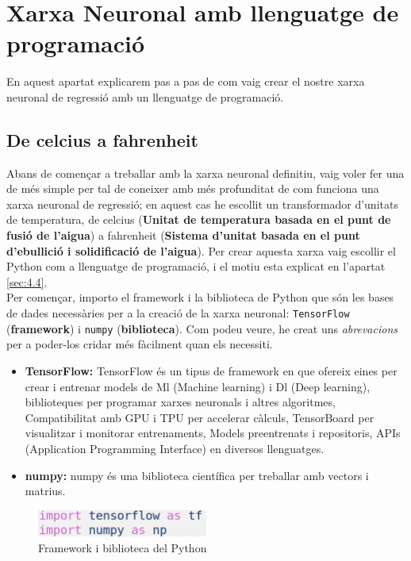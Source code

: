 \section{Xarxa Neuronal amb llenguatge de programació}\label{sec:10}
En aquest apartat explicarem pas a pas de com vaig crear el nostre xarxa neuronal de regressió amb un llenguatge de programació.

\subsection{De celcius a fahrenheit}

Abans de començar a treballar amb la xarxa neuronal definitiu, vaig voler fer una de més simple per tal de coneixer amb més profunditat de com funciona una xarxa neuronal de regressió; en aquest cas he escollit un transformador d'unitats de temperatura, de celcius (\textbf{Unitat de temperatura basada en el punt de fusió de l'aigua}) a fahrenheit (\textbf{Sistema d'unitat basada en el punt d'ebullició i solidificació de l'aigua}). Per crear aquesta xarxa vaig escollir el Python com a llenguatge de programació, i el motiu esta explicat en l'apartat \ref{sec:4.4}.\\


Per començar, importo el framework i la biblioteca de Python que són les bases de dades necessàries per a la creació de la xarxa neuronal: \texttt{TensorFlow} (\textbf{framework}) i \texttt{{numpy}} (\textbf{biblioteca}). Com podeu veure, he creat uns \textit{abrevacions} per a poder-los cridar més fàcilment quan els necessiti.

\begin{itemize}
 \item \textbf{TensorFlow: }\label{TensorFlow} TensorFlow és un tipus de framework en que ofereix eines per crear i entrenar models de Ml (Machine learning) i Dl (Deep learning), biblioteques per programar xarxes neuronals i altres algoritmes, Compatibilitat amb GPU i TPU per accelerar càlculs, TensorBoard per visualitzar i monitorar entrenaments, Models preentrenats i repositoris, APIs (Application Programming Interface) en diversos llenguatges.
 \item \textbf{numpy: }\label{numpy} numpy és una biblioteca científica per treballar amb vectors i matrius.
\end{itemize}
\begin{figure}[H]
    \centering
    \includegraphics[width=0.5\textwidth]{./figures/1.png}
    \caption{Framework i biblioteca del Python}
\end{figure}


